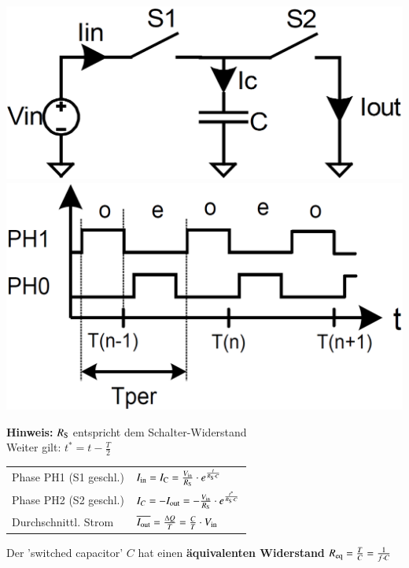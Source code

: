 \begin{minipage}[c]{0.28\columnwidth}
    \includegraphics[width=\columnwidth]{images/grundprinzip_switched_capacitor_schaltung.png}
    \vspace{0.2cm}
    \includegraphics[width=\columnwidth]{images/grundprinzip_switched_capacitor_timing.png}
\end{minipage}
\hfill
\begin{minipage}[c]{0.7\columnwidth}
    \textbf{Hinweis:} $R_{\rm S}$ entspricht dem Schalter-Widerstand \\
    Weiter gilt: $t^* = t - \frac{T}{2}$

    \begin{tabular}{ll@{}} 
        Phase PH1 (S1 geschl.)  & $I_{\rm in} = I_{\rm C} = \frac{V_{\rm in}}{R_{\rm S}} \cdot e^{\frac{t}{R_{\rm S} \cdot C}} $ \\
        Phase PH2 (S2 geschl.)  & $I_C = - I_{\rm out} = - \frac{V_{\rm in}}{R_{\rm S}} \cdot e^{\frac{t^*}{R_{\rm S} \cdot C}}$ \\
        Durchschnittl. Strom    & $\overline{I_{\rm out}} = \frac{\Delta Q}{T} =\frac{C}{T} \cdot V_{\rm in}$ \\
    \end{tabular}

    Der 'switched capacitor' $C$ hat einen \textbf{äquivalenten Widerstand} $R_{\rm eq} = \frac{T}{C} = \frac{1}{f \cdot C}$
\end{minipage}


